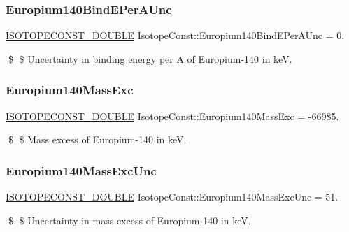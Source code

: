 \subsubsection{\texorpdfstring{Europium140\+Bind\+E\+Per\+A\+Unc}{Europium140BindEPerAUnc}}
{\footnotesize\ttfamily \mbox{\hyperlink{group___isotope_const-_macros_ga8f45a7272ce02c0b4c65c44636ed719a}{I\+S\+O\+T\+O\+P\+E\+C\+O\+N\+S\+T\+\_\+\+D\+O\+U\+B\+LE}} Isotope\+Const\+::\+Europium140\+Bind\+E\+Per\+A\+Unc = 0.}

\$ \$ Uncertainty in binding energy per A of Europium-\/140 in keV. \mbox{\label{group___isotope_const-_europium-_eu140_ga28b67ff1b73e0e5dfc7f282f36a30bc4}} 
\subsubsection{\texorpdfstring{Europium140\+Mass\+Exc}{Europium140MassExc}}
{\footnotesize\ttfamily \mbox{\hyperlink{group___isotope_const-_macros_ga8f45a7272ce02c0b4c65c44636ed719a}{I\+S\+O\+T\+O\+P\+E\+C\+O\+N\+S\+T\+\_\+\+D\+O\+U\+B\+LE}} Isotope\+Const\+::\+Europium140\+Mass\+Exc = -\/66985.}

\$ \$ Mass excess of Europium-\/140 in keV. \mbox{\label{group___isotope_const-_europium-_eu140_ga87eeb53e8c9ed250960928f5bae4b601}} 
\subsubsection{\texorpdfstring{Europium140\+Mass\+Exc\+Unc}{Europium140MassExcUnc}}
{\footnotesize\ttfamily \mbox{\hyperlink{group___isotope_const-_macros_ga8f45a7272ce02c0b4c65c44636ed719a}{I\+S\+O\+T\+O\+P\+E\+C\+O\+N\+S\+T\+\_\+\+D\+O\+U\+B\+LE}} Isotope\+Const\+::\+Europium140\+Mass\+Exc\+Unc = 51.}

\$ \$ Uncertainty in mass excess of Europium-\/140 in keV. \mbox{\label{group___isotope_const-_europium-_eu140_gaf396a575f54f98e6456dc8ee5ef4ec52}} 
